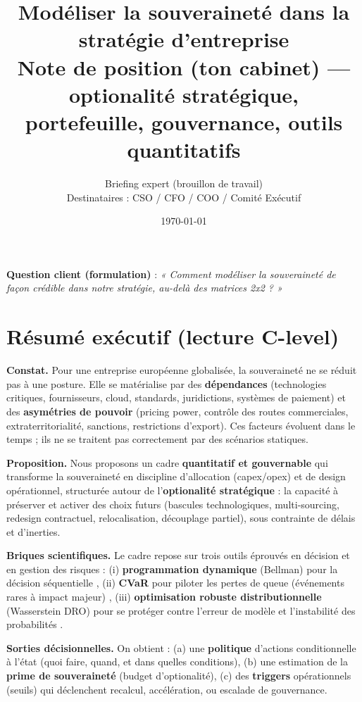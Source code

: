 \documentclass[11pt,a4paper]{article}
\title{\textbf{Modéliser la souveraineté dans la stratégie d’entreprise}\\
\large Note de position (ton cabinet) — optionalité stratégique, portefeuille, gouvernance, outils quantitatifs}
\author{Briefing expert (brouillon de travail)\\\small{Destinataires : CSO / CFO / COO / Comité Exécutif}}
\date{\today}
\begin{document}
\maketitle

\vspace{-0.3cm}
\begin{center}
\small
\textbf{Question client (formulation)} : \emph{« Comment modéliser la souveraineté de façon crédible dans notre stratégie, au-delà des matrices 2x2 ? »}
\end{center}

\section*{Résumé exécutif (lecture C-level)}

\textbf{Constat.} Pour une entreprise européenne globalisée, la souveraineté ne se réduit pas à une posture. Elle se matérialise par des \textbf{dépendances} (technologies critiques, fournisseurs, cloud, standards, juridictions, systèmes de paiement) et des \textbf{asymétries de pouvoir} (pricing power, contrôle des routes commerciales, extraterritorialité, sanctions, restrictions d’export).
Ces facteurs évoluent dans le temps ; ils ne se traitent pas correctement par des scénarios statiques.

\textbf{Proposition.} Nous proposons un cadre \textbf{quantitatif et gouvernable} qui transforme la souveraineté en discipline d’allocation (capex/opex) et de design opérationnel, structurée autour de l’\textbf{optionalité stratégique} :
la capacité à préserver et activer des choix futurs (bascules technologiques, multi-sourcing, redesign contractuel, relocalisation, découplage partiel), sous contrainte de délais et d’inerties.

\textbf{Briques scientifiques.} Le cadre repose sur trois outils éprouvés en décision et en gestion des risques :
(i) \textbf{programmation dynamique} (Bellman) pour la décision séquentielle \citep{bellman1957},
(ii) \textbf{CVaR} pour piloter les pertes de queue (événements rares à impact majeur) \citep{rockafellarryasev2000},
(iii) \textbf{optimisation robuste distributionnelle} (Wasserstein DRO) pour se protéger contre l’erreur de modèle et l’instabilité des probabilités \citep{esfahani-kuhn2018}.

\textbf{Sorties décisionnelles.} On obtient : (a) une \textbf{politique} d’actions conditionnelle à l’état (quoi faire, quand, et dans quelles conditions), (b) une estimation de la \textbf{prime de souveraineté} (budget d’optionalité), (c) des \textbf{triggers} opérationnels (seuils) qui déclenchent recalcul, accélération, ou escalade de gouvernance.
\end{document}
